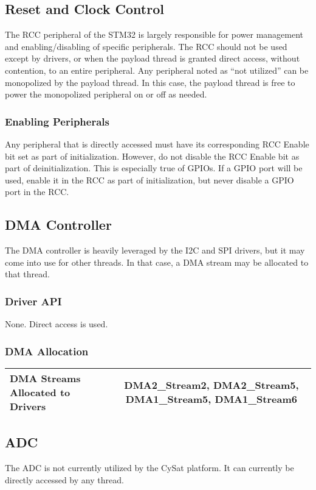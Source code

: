 \documentclass{article}
\begin{document}
\subsection{Reset and Clock Control}
The RCC peripheral of the STM32 is largely responsible for power management
and enabling/disabling of specific peripherals. The RCC 
should not be used except
by drivers, or when the payload thread 
is granted direct access, without contention,
to an entire peripheral. Any peripheral noted as ``not utilized'' can
be monopolized by the payload thread. 
In this case, the payload thread is free to
power the monopolized peripheral on or off as needed.
\subsubsection{Enabling Peripherals}
Any peripheral that is directly accessed must have its corresponding 
RCC Enable bit set as part of initialization. However, do not disable
the RCC Enable bit as part of deinitialization. This is especially
true of GPIOs. If a GPIO port will be used, enable it in the
RCC as part of initialization, but never disable a GPIO port in
the RCC.

\subsection{DMA Controller}
The DMA controller is heavily leveraged by the I2C and SPI drivers, but it may
come into use for other threads. In that case, a DMA stream may be allocated
to that thread.
\subsubsection{Driver API}
None. Direct access is used.
\subsubsection{DMA Allocation}
\begin{tabular}{| l | c |}
    \hline 
    DMA Streams Allocated to Drivers & DMA2\_Stream2, DMA2\_Stream5, DMA1\_Stream5, DMA1\_Stream6\\ \hline
\end{tabular}

\subsection{ADC}
The ADC is not currently utilized by the CySat platform. It can currently be directly
accessed by any thread.
\end{document}
